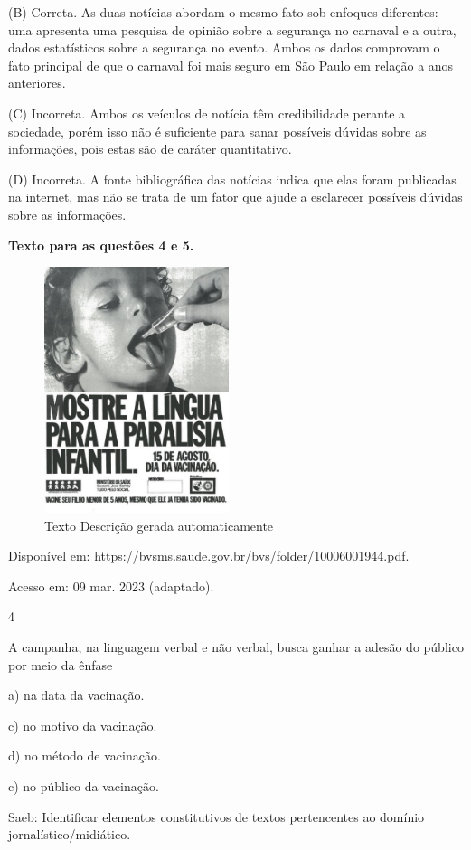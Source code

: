 (B) Correta. As duas notícias abordam o mesmo fato sob enfoques
diferentes: uma apresenta uma pesquisa de opinião sobre a segurança no
carnaval e a outra, dados estatísticos sobre a segurança no evento.
Ambos os dados comprovam o fato principal de que o carnaval foi mais
seguro em São Paulo em relação a anos anteriores.

(C) Incorreta. Ambos os veículos de notícia têm credibilidade perante a
sociedade, porém isso não é suficiente para sanar possíveis dúvidas
sobre as informações, pois estas são de caráter quantitativo.

(D) Incorreta. A fonte bibliográfica das notícias indica que elas foram
publicadas na internet, mas não se trata de um fator que ajude a
esclarecer possíveis dúvidas sobre as informações.

\textbf{Texto para as questões 4 e 5.}

\begin{figure}
\centering
\includegraphics[width=2.12879in,height=2.83333in]{./imgSAEB_8_POR/media/image39.jpeg}
\caption{Texto Descrição gerada automaticamente}
\end{figure}

Disponível em: https://bvsms.saude.gov.br/bvs/folder/10006001944.pdf.

Acesso em: 09 mar. 2023 (adaptado).

\num{4}

A campanha, na linguagem verbal e não verbal, busca ganhar a adesão do
público por meio da ênfase

a) na data da vacinação.

c) no motivo da vacinação.

d) no método de vacinação.

c) no público da vacinação.

Saeb: Identificar elementos constitutivos de textos pertencentes ao
domínio jornalístico/midiático.

